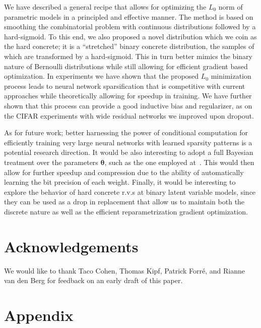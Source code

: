 \documentclass{article} %
\def\!#1{\boldsymbol{#1}}
\begin{document}
We have described a general recipe that allows for optimizing the $L_0$ norm of parametric models in a principled and effective manner. The method is based on smoothing the combinatorial problem with continuous distributions followed by a hard-sigmoid. To this end, we also proposed a novel distribution which we coin as the hard concrete; it is a ``stretched'' binary concrete distribution, the samples of which are transformed by a hard-sigmoid. This in turn better mimics the binary nature of Bernoulli distributions while still allowing for efficient gradient based optimization. In experiments we have shown that the proposed $L_0$ minimization process leads to neural network sparsification that is competitive with current approaches while theoretically allowing for speedup in training. We have further shown that this process can provide a good inductive bias and regularizer, as on the CIFAR experiments with wide residual networks we improved upon dropout. 

As for future work; better harnessing the power of conditional computation for efficiently training very large neural networks with learned sparsity patterns is a potential research direction. It would be also interesting to adopt a full Bayesian treatment over the parameters $\!\theta$, such as the one employed at~\cite{molchanov2017variational,louizos2017bayesian}. This would then allow for further speedup and compression due to the ability of automatically learning the bit precision of each weight. Finally, it would be interesting to explore the behavior of hard concrete r.v.s at binary latent variable models, since they can be used as a drop in replacement that allow us to maintain both the discrete nature as well as the efficient reparametrization gradient optimization. 
\section*{Acknowledgements}
We would like to thank Taco Cohen, Thomas Kipf, Patrick Forr\'e, and Rianne van den Berg for feedback on an early draft of this paper. 




\appendix
\section*{Appendix}
\end{document}
